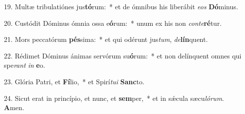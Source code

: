 19. Multæ tribulatiónes jus\textbf{tó}rum:~*  et de ómnibus his liberábit \textit{e}\textit{os} \textbf{Dó}minus.\

20. Custódit Dóminus ómnia ossa e\textbf{ó}rum:~*  unum ex his non \textit{con}\textit{te}\textbf{ré}tur.\

21. Mors peccatórum \textbf{pés}sima:~*  et qui odérunt jus\textit{tum}, \textit{de}\textbf{lín}quent.\

22. Rédimet Dóminus ánimas servórum su\textbf{ó}rum:~*  et non delínquent omnes qui spe\textit{rant} \textit{in} \textbf{e}o.\

23. Glória Patri, et \textbf{Fí}lio,~*  et Spirí\textit{tu}\textit{i} \textbf{Sanc}to.\

24. Sicut erat in princípio, et nunc, et \textbf{sem}per,~*  et in sǽcula sæcu\textit{ló}\textit{rum}. \textbf{A}men.\

